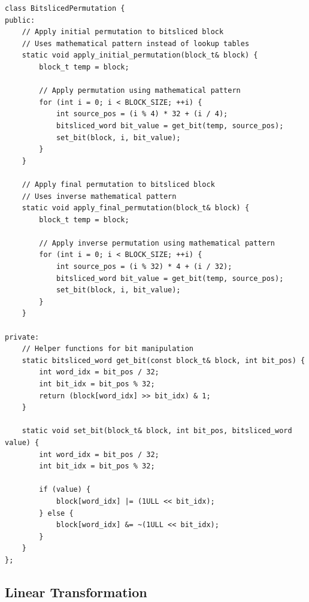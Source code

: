 \documentclass[12pt,a4paper]{article}
\begin{document}
\begin{lstlisting}[caption=Bitsliced Permutation Implementation]
class BitslicedPermutation {
public:
    // Apply initial permutation to bitsliced block
    // Uses mathematical pattern instead of lookup tables
    static void apply_initial_permutation(block_t& block) {
        block_t temp = block;
        
        // Apply permutation using mathematical pattern
        for (int i = 0; i < BLOCK_SIZE; ++i) {
            int source_pos = (i % 4) * 32 + (i / 4);
            bitsliced_word bit_value = get_bit(temp, source_pos);
            set_bit(block, i, bit_value);
        }
    }
    
    // Apply final permutation to bitsliced block
    // Uses inverse mathematical pattern
    static void apply_final_permutation(block_t& block) {
        block_t temp = block;
        
        // Apply inverse permutation using mathematical pattern
        for (int i = 0; i < BLOCK_SIZE; ++i) {
            int source_pos = (i % 32) * 4 + (i / 32);
            bitsliced_word bit_value = get_bit(temp, source_pos);
            set_bit(block, i, bit_value);
        }
    }

private:
    // Helper functions for bit manipulation
    static bitsliced_word get_bit(const block_t& block, int bit_pos) {
        int word_idx = bit_pos / 32;
        int bit_idx = bit_pos % 32;
        return (block[word_idx] >> bit_idx) & 1;
    }

    static void set_bit(block_t& block, int bit_pos, bitsliced_word value) {
        int word_idx = bit_pos / 32;
        int bit_idx = bit_pos % 32;
        
        if (value) {
            block[word_idx] |= (1ULL << bit_idx);
        } else {
            block[word_idx] &= ~(1ULL << bit_idx);
        }
    }
};
\end{lstlisting}

\subsection{Linear Transformation}
\end{document}
